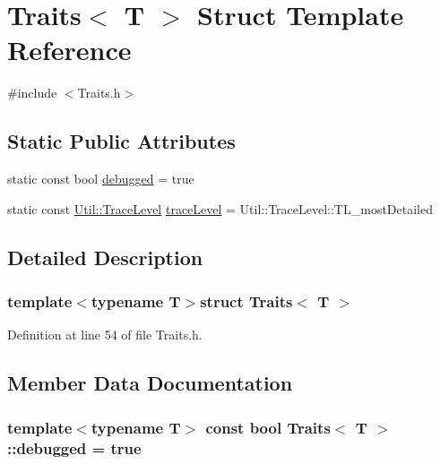 \hypertarget{struct_traits}{\section{Traits$<$ T $>$ Struct Template Reference}
\label{struct_traits}
}


{\ttfamily \#include $<$Traits.\-h$>$}

\subsection*{Static Public Attributes}
\begin{DoxyCompactItemize}
\item 
static const bool \hyperlink{struct_traits_a0abb19a116800ab778598eed38bad4a0}{debugged} = true
\item 
static const \hyperlink{class_util_a604561d00f5999b5ca280401140e58d9}{Util\-::\-Trace\-Level} \hyperlink{struct_traits_a032499d15672915dd3349e6cc0e9c673}{trace\-Level} = Util\-::\-Trace\-Level\-::\-T\-L\-\_\-most\-Detailed
\end{DoxyCompactItemize}


\subsection{Detailed Description}
\subsubsection*{template$<$typename T$>$struct Traits$<$ T $>$}



Definition at line 54 of file Traits.\-h.



\subsection{Member Data Documentation}
\hypertarget{struct_traits_a0abb19a116800ab778598eed38bad4a0}{
\subsubsection[{debugged}]{\setlength{\rightskip}{0pt plus 5cm}template$<$typename T$>$ const bool {\bf Traits}$<$ T $>$\-::debugged = true\hspace{0.3cm}{\ttfamily [static]}}}\label{struct_traits_a0abb19a116800ab778598eed38bad4a0}


